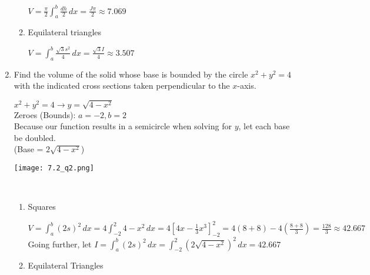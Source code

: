 \documentclass[10pt,letterpaper]{report}
\begin{document}
\begin{enumerate}
\begin{enumerate}
      $V=\frac{\pi}{2}\int_{a}^{b}{\frac{dh}{2}}\,dx=\frac{J\pi}{2}\approx7.069$ \\
      
    \item{Equilateral triangles \\}
    
    $V=\int_{a}^{b}{\frac{\sqrt{3}s^{2}}{4}}\,dx=\frac{\sqrt{3}I}{4}\approx3.507$ \\
  \end{enumerate}
  
  \pagebreak
  
  \item{Find the volume of the solid whose base is bounded by the circle $x^{2}+y^{2}=4$ with the indicated cross sections taken perpendicular to the $x$-axis. \\}
  \begin{multicols}{2}
    $x^{2}+y^{2}=4\rightarrow y=\sqrt{4-x^{2}}$ \\
    
    Zeroes (Bounds): $a=-2, b=2$ \\
    
    Because our function results in a semicircle when solving for $y$, let each base be doubled. \\
    
    (Base = $2\sqrt{4-x^{2}}$) \\
    
    \vfill\null
    
    \columnbreak
    
    \begin{center}
      \texttt{[image: 7.2\_q2.png]} \\
    \end{center} \\
    \columnbreak
  \end{multicols}
  \begin{enumerate}
    \item{Squares \\}
      
      $V=\int_{a}^{b}{(2s)^{2}}\,dx=4\int_{-2}^{2}{4-x^{2}}\,dx=4[4x-\frac{1}{3}x^{3}]_{-2}^{2}=4(8+8)-4\left(\frac{8+8}{3}\right)=\frac{128}{3}\approx 42.667$ \\
      
      Going further, let $I=\int_{a}^{b}{(2s)^{2}}\,dx=\int_{-2}^{2}{(2\sqrt{4-x^{2}})^{2}}\,dx=42.667$ \\
      
    \item{Equilateral Triangles \\}
    

\end{enumerate}
\end{enumerate}
\end{document}
